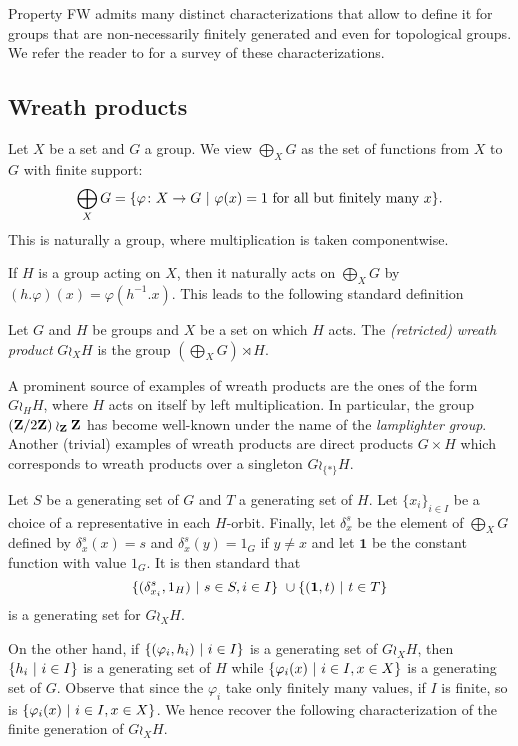Property FW admits many distinct characterizations that allow to define it for groups that are non-necessarily finitely generated and even for topological groups. We refer the reader to \cite{Cornulier2013} for a survey of these characterizations.
%
%
%
%
%
%
%
%
%
%
\subsection{Wreath products}
%
%
%
%
%
Let $X$ be a set and $G$ a group. We view
$\bigoplus_XG$ as the set of functions from $X$ to $G$ with finite support:
\[
	\bigoplus_XG=\{\varphi\colon X\to G\ |\ \varphi(x)=1 \textnormal{ for all but finitely many }x\}.
\]
This is naturally a group, where multiplication is taken componentwise.

If $H$ is a group acting on $X$, then it naturally acts on $\bigoplus_XG$
by $(h.\varphi)(x)=\varphi(h^{-1}.x)$.
This leads to the following standard definition
\begin{defn}\label{Def:WreathProd}
Let $G$ and $H$ be groups and $X$ be a set on which $H$ acts.
The \emph{(retricted) wreath product} $G\wr_XH$ is the group $(\bigoplus_XG)\rtimes H$.
\end{defn}
A prominent  source of examples of wreath products are the ones of the form $G\wr_HH$, where $H$ acts on itself by left multiplication.
In particular, the group $(\mathbf{Z}/2\mathbf{Z})\wr_{\mathbf{Z}}\mathbf{Z}$ has become well-known under the name of the \emph{lamplighter group}.
Another (trivial) examples of wreath products are direct products $G\times H$ which corresponds to wreath products over a singleton $G\wr_{\{*\}}H$.

Let $S$ be a generating set of $G$ and $T$ a generating set of $H$.
Let $\{x_i\}_{i\in I}$ be a choice of a representative in each $H$-orbit.
Finally, let $\delta_x^s$ be the element of $\bigoplus_XG$ defined by $\delta_x^s(x)=s$ and $\delta_x^s(y)=1_G$ if $y\neq x$ and let $\mathbf 1$ be the constant function with value $1_G$.
It is then standard that
\[
	\setst{(\delta_{x_i}^s,1_H)}{s \in S,i\in I} \cup \setst{(\mathbf 1,t)}{t \in T}
\]
is a generating set for $G\wr_XH$.

On the other hand, if $\{(\varphi_i,h_i)\ |\ i\in I\}$ is a generating set of $G\wr_XH$, then $\{h_i\ |\ i\in I\}$ is a generating set of $H$ while $\{\varphi_i(x)\ |\ i\in I,x\in X\}$ is a generating set of $G$.
Observe that since the $\varphi_i$ take only finitely many values, if $I$ is finite, so is $\{\varphi_i(x)\ |\ i\in I,x\in X\}$.
We hence recover the following characterization of the finite generation of $G\wr_XH$.

